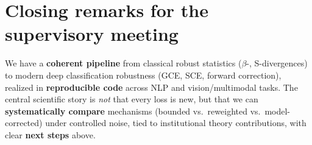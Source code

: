 \documentclass[11pt,a4paper]{article}
\begin{document}
\section*{Closing remarks for the supervisory meeting}

We have a \textbf{coherent pipeline} from classical robust statistics ($\beta$-, S-divergences) to modern deep classification robustness (GCE, SCE, forward correction), realized in \textbf{reproducible code} across NLP and vision/multimodal tasks. The central scientific story is \emph{not} that every loss is new, but that we can \textbf{systematically compare} mechanisms (bounded vs.\ reweighted vs.\ model-corrected) under controlled noise, tied to institutional theory contributions, with clear \textbf{next steps} above.
\end{document}
